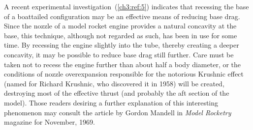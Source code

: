 A recent experimental investigation~(\ref{ch3:ref:5}) indicates that recessing
the base of a boattailed configuration may be an effective means of reducing
base drag. Since the nozzle of a model rocket engine provides a natural
concavity at the base, this technique, although not regarded as such, has
been in use for some time. By recessing the engine slightly into the tube,
thereby creating a deeper concavity, it may be possible to reduce base drag
still further. Care must be taken not to recess the engine further than about
half a body diameter, or the conditions of nozzle overexpansion responsible
for the notorious Krushnic effect (named for Richard Krushnic, who discovered
it in 1958) will be created, destroying most of the effective thrust (and
probably the aft section of the model). Those readers desiring a further
explanation of this interesting phenomenon may consult the article by Gordon
Mandell in \emph{Model Rocketry} magazine for November, 1969.
